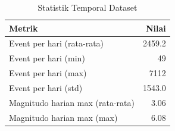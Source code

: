 \begin{table}
\caption{Statistik Temporal Dataset}
\label{tab:temporal_stats}
\begin{tabular}{|l|r|}
\toprule
Metrik & Nilai \\
\midrule
Event per hari (rata-rata) & 2459.2 \\
Event per hari (min) & 49 \\
Event per hari (max) & 7112 \\
Event per hari (std) & 1543.0 \\
Magnitudo harian max (rata-rata) & 3.06 \\
Magnitudo harian max (max) & 6.08 \\
\bottomrule
\end{tabular}
\end{table}
